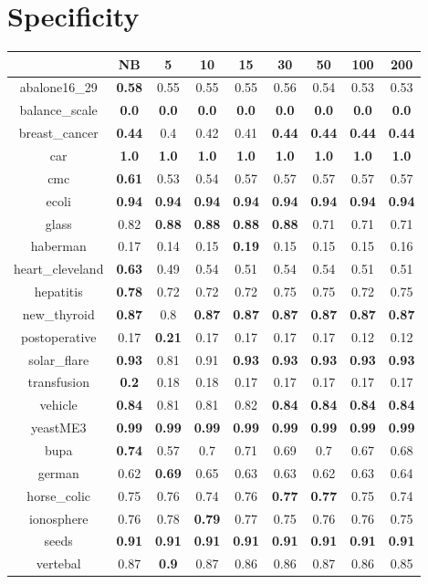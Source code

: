 \documentclass{article}%
\begin{document}
%
\section*{Specificity}%
\begin{tabular}{c|cccccccc}%
\hline%
&NB&5&10&15&30&50&100&200\\%
\hline%
abalone16\_29&\textbf{0.58}&0.55&0.55&0.55&0.56&0.54&0.53&0.53\\%
\hline%
balance\_scale&\textbf{0.0}&\textbf{0.0}&\textbf{0.0}&\textbf{0.0}&\textbf{0.0}&\textbf{0.0}&\textbf{0.0}&\textbf{0.0}\\%
\hline%
breast\_cancer&\textbf{0.44}&0.4&0.42&0.41&\textbf{0.44}&\textbf{0.44}&\textbf{0.44}&\textbf{0.44}\\%
\hline%
car&\textbf{1.0}&\textbf{1.0}&\textbf{1.0}&\textbf{1.0}&\textbf{1.0}&\textbf{1.0}&\textbf{1.0}&\textbf{1.0}\\%
\hline%
cmc&\textbf{0.61}&0.53&0.54&0.57&0.57&0.57&0.57&0.57\\%
\hline%
ecoli&\textbf{0.94}&\textbf{0.94}&\textbf{0.94}&\textbf{0.94}&\textbf{0.94}&\textbf{0.94}&\textbf{0.94}&\textbf{0.94}\\%
\hline%
glass&0.82&\textbf{0.88}&\textbf{0.88}&\textbf{0.88}&\textbf{0.88}&0.71&0.71&0.71\\%
\hline%
haberman&0.17&0.14&0.15&\textbf{0.19}&0.15&0.15&0.15&0.16\\%
\hline%
heart\_cleveland&\textbf{0.63}&0.49&0.54&0.51&0.54&0.54&0.51&0.51\\%
\hline%
hepatitis&\textbf{0.78}&0.72&0.72&0.72&0.75&0.75&0.72&0.75\\%
\hline%
new\_thyroid&\textbf{0.87}&0.8&\textbf{0.87}&\textbf{0.87}&\textbf{0.87}&\textbf{0.87}&\textbf{0.87}&\textbf{0.87}\\%
\hline%
postoperative&0.17&\textbf{0.21}&0.17&0.17&0.17&0.17&0.12&0.12\\%
\hline%
solar\_flare&\textbf{0.93}&0.81&0.91&\textbf{0.93}&\textbf{0.93}&\textbf{0.93}&\textbf{0.93}&\textbf{0.93}\\%
\hline%
transfusion&\textbf{0.2}&0.18&0.18&0.17&0.17&0.17&0.17&0.17\\%
\hline%
vehicle&\textbf{0.84}&0.81&0.81&0.82&\textbf{0.84}&\textbf{0.84}&\textbf{0.84}&\textbf{0.84}\\%
\hline%
yeastME3&\textbf{0.99}&\textbf{0.99}&\textbf{0.99}&\textbf{0.99}&\textbf{0.99}&\textbf{0.99}&\textbf{0.99}&\textbf{0.99}\\%
\hline%
bupa&\textbf{0.74}&0.57&0.7&0.71&0.69&0.7&0.67&0.68\\%
\hline%
german&0.62&\textbf{0.69}&0.65&0.63&0.63&0.62&0.63&0.64\\%
\hline%
horse\_colic&0.75&0.76&0.74&0.76&\textbf{0.77}&\textbf{0.77}&0.75&0.74\\%
\hline%
ionosphere&0.76&0.78&\textbf{0.79}&0.77&0.75&0.76&0.76&0.75\\%
\hline%
seeds&\textbf{0.91}&\textbf{0.91}&\textbf{0.91}&\textbf{0.91}&\textbf{0.91}&\textbf{0.91}&\textbf{0.91}&\textbf{0.91}\\%
\hline%
vertebal&0.87&\textbf{0.9}&0.87&0.86&0.86&0.87&0.86&0.85\\%
\hline%
\end{tabular}
\end{document}

